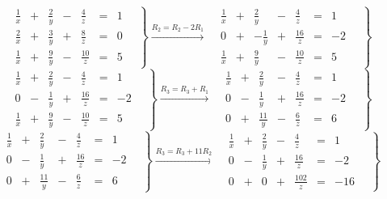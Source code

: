 \documentclass[11pt]{article}
\begin{document}
\begin{equation*}
  \left.
    \begin{alignedat}{5}
      &  \frac{1}{x} & {}+{} & \frac{2}{y} & {}-{} & \frac{4}{z}  & {}={} & 1 \\
      &  \frac{2}{x} & {}+{} & \frac{3}{y} & {}+{} & \frac{8}{z}  & {}={} & 0 \\
      &  \frac{1}{x} & {}+{} & \frac{9}{y} & {}-{} & \frac{10}{z} & {}={} & 5
    \end{alignedat}
    \quad \right\}
  \xrightarrow{R_2 = R_2 - 2R_1}
  \left.
    \begin{alignedat}{5}
      &  \frac{1}{x} & {}+{} & \frac{2}{y}  & {}-{} & \frac{4}{z}  & {}={} & 1 \\
      &  0           & {}+{} & -\frac{1}{y} & {}+{} & \frac{16}{z} & {}={} & -2 \\
      &  \frac{1}{x} & {}+{} & \frac{9}{y}  & {}-{} & \frac{10}{z} & {}={} & 5
    \end{alignedat}
    \quad \right\}
\end{equation*}
\begin{equation*}
  \left.
    \begin{alignedat}{5}
      &  \frac{1}{x} & {}+{} & \frac{2}{y} & {}-{} & \frac{4}{z}  & {}={} & 1 \\
      &  0           & {}-{} & \frac{1}{y} & {}+{} & \frac{16}{z} & {}={} & -2 \\
      &  \frac{1}{x} & {}+{} & \frac{9}{y} & {}-{} & \frac{10}{z} & {}={} & 5
    \end{alignedat}
    \quad \right\}
  \xrightarrow{R_3 = R_3 + R_1}
  \left.
    \begin{alignedat}{5}
      &  \frac{1}{x} & {}+{} & \frac{2}{y}  & {}-{} & \frac{4}{z}  & {}={} & 1 \\
      &  0           & {}-{} & \frac{1}{y}  & {}+{} & \frac{16}{z} & {}={} & -2 \\
      &  0           & {}+{} & \frac{11}{y} & {}-{} & \frac{6}{z}  & {}={} & 6
    \end{alignedat}
    \quad \right\}
\end{equation*}
\begin{equation*}
  \left.
    \begin{alignedat}{5}
      &  \frac{1}{x} & {}+{} & \frac{2}{y}  & {}-{} & \frac{4}{z}  & {}={} & 1 \\
      &  0           & {}-{} & \frac{1}{y}  & {}+{} & \frac{16}{z} & {}={} & -2 \\
      &  0           & {}+{} & \frac{11}{y} & {}-{} & \frac{6}{z}  & {}={} & 6
    \end{alignedat}
    \quad \right\}
  \xrightarrow{R_3 = R_3 + 11R_2}
  \left.
    \begin{alignedat}{5}
      &  \frac{1}{x} & {}+{} & \frac{2}{y} & {}-{} & \frac{4}{z}   & {}={} & 1 \\
      &  0           & {}-{} & \frac{1}{y} & {}+{} & \frac{16}{z}  & {}={} & -2 \\
      &  0           & {}+{} & 0           & {}+{} & \frac{102}{z} & {}={} & -16
    \end{alignedat}
    \quad \right\}
\end{equation*}
\end{document}
